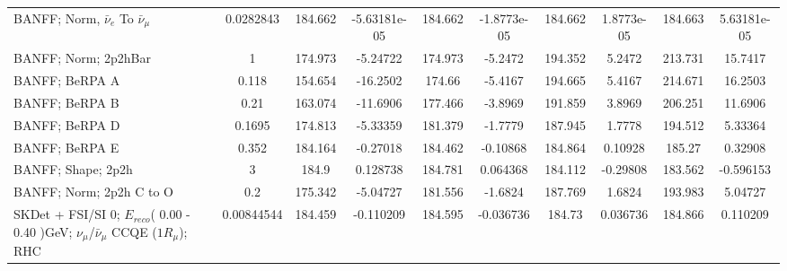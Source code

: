 \documentclass{standalone}
\begin{document}
\begin{tabular}{| l | S | S  S | S  S | S  S | S  S | }
                               BANFF; Norm, $\bar{\nu}_{e}$ To $\bar{\nu}_{\mu}$ &       0.0282843 &         184.662 &    -5.63181e-05 &         184.662 &     -1.8773e-05 &         184.662 &      1.8773e-05 &         184.663 &     5.63181e-05 \\ 
                                                            BANFF; Norm; 2p2hBar &               1 &         174.973 &        -5.24722 &         174.973 &         -5.2472 &         194.352 &          5.2472 &         213.731 &         15.7417 \\ 
                                                                  BANFF; BeRPA A &           0.118 &         154.654 &        -16.2502 &          174.66 &         -5.4167 &         194.665 &          5.4167 &         214.671 &         16.2503 \\ 
                                                                  BANFF; BeRPA B &            0.21 &         163.074 &        -11.6906 &         177.466 &         -3.8969 &         191.859 &          3.8969 &         206.251 &         11.6906 \\ 
                                                                  BANFF; BeRPA D &          0.1695 &         174.813 &        -5.33359 &         181.379 &         -1.7779 &         187.945 &          1.7778 &         194.512 &         5.33364 \\ 
                                                                  BANFF; BeRPA E &           0.352 &         184.164 &        -0.27018 &         184.462 &        -0.10868 &         184.864 &         0.10928 &          185.27 &         0.32908 \\ 
                                                              BANFF; Shape; 2p2h &               3 &           184.9 &        0.128738 &         184.781 &        0.064368 &         184.112 &        -0.29808 &         183.562 &       -0.596153 \\ 
                                                        BANFF; Norm; 2p2h C to O &             0.2 &         175.342 &        -5.04727 &         181.556 &         -1.6824 &         187.769 &          1.6824 &         193.983 &         5.04727 \\ 
SKDet + FSI/SI  0; $E_{reco}$( 0.00 - 0.40 )GeV; $\nu_{\mu}$/$\bar{\nu}_{\mu}$ CCQE ($1R_{\mu}$); RHC &      0.00844544 &         184.459 &       -0.110209 &         184.595 &       -0.036736 &          184.73 &        0.036736 &         184.866 &        0.110209 \\ 

\end{tabular}
\end{document}
